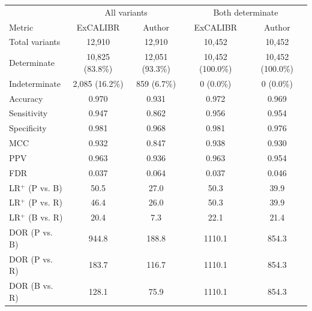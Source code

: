 \begin{tabular}{lcccc}
\toprule
 & \multicolumn{2}{c}{All variants} & \multicolumn{2}{c}{Both determinate} \\
Metric & ExCALIBR & Author & ExCALIBR & Author \\
\midrule
Total variants & 12,910 & 12,910 & 10,452 & 10,452 \\
Determinate & 10,825 (83.8\%) & 12,051 (93.3\%) & 10,452 (100.0\%) & 10,452 (100.0\%) \\
Indeterminate & 2,085 (16.2\%) & 859 (6.7\%) & 0 (0.0\%) & 0 (0.0\%) \\
\midrule
Accuracy & 0.970 & 0.931 & 0.972 & 0.969 \\
Sensitivity & 0.947 & 0.862 & 0.956 & 0.954 \\
Specificity & 0.981 & 0.968 & 0.981 & 0.976 \\
MCC & 0.932 & 0.847 & 0.938 & 0.930 \\
PPV & 0.963 & 0.936 & 0.963 & 0.954 \\
FDR & 0.037 & 0.064 & 0.037 & 0.046 \\
\midrule
LR$^+$ (P vs. B) & 50.5 & 27.0 & 50.3 & 39.9 \\
LR$^+$ (P vs. R) & 46.4 & 26.0 & 50.3 & 39.9 \\
LR$^+$ (B vs. R) & 20.4 & 7.3 & 22.1 & 21.4 \\
DOR (P vs. B) & 944.8 & 188.8 & 1110.1 & 854.3 \\
DOR (P vs. R) & 183.7 & 116.7 & 1110.1 & 854.3 \\
DOR (B vs. R) & 128.1 & 75.9 & 1110.1 & 854.3 \\
\bottomrule
\end{tabular}

